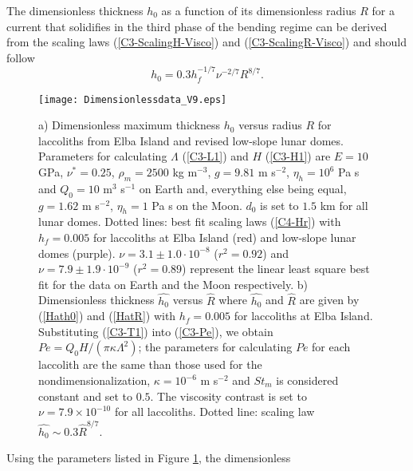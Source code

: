 The dimensionless thickness  $h_0$ as a function  of its dimensionless
radius $R$  for a current  that solidifies in  the third phase  of the
bending   regime    can   be    derived   from   the    scaling   laws
(\ref{C3-ScalingH-Visco})  and  (\ref{C3-ScalingR-Visco})  and  should
follow
\begin{equation}
  h_0 = 0.3 h_f^{-1/7}\nu^{-2/7}R^{8/7}\label{C4-Hr}.
\end{equation}
\begin{figure}[h!]
  \begin{center}
    \graphicspath{ {/Users/thorey/Documents/These/Projet/Refroidissement/Skin_Model/Figure/Figure_Heating/} }
    \texttt{[image: Dimensionlessdata\_V9.eps]}
    \caption{a)  Dimensionless maximum  thickness $h_0$  versus radius
      $R$ for laccoliths from Elba  Island and revised low-slope lunar
      domes.  Parameters  for calculating $\Lambda$  (\ref{C3-L1}) and
      $H$ (\ref{C3-H1}) are $E=10$  GPa, $\nu^*=0.25$, $\rho_m = 2500$
      kg  m$^{-3}$,  $g=9.81$ m  s$^{-2}$,  $\eta_h  =10^6$ Pa  s  and
      $Q_0 =  10$ m$^3$ s$^{-1}$  on Earth and, everything  else being
      equal, $g=1.62$ m s$^{-2}$, $\eta_h =1$  Pa s on the Moon. $d_0$
      is set to $1.5$ km for  all lunar domes.  Dotted lines: best fit
      scaling laws (\ref{C4-Hr}) with $h_f  = 0.005$ for laccoliths at
      Elba   Island  (red)   and  low-slope   lunar  domes   (purple).
      $\nu   =   3.1\pm   1.0    \cdot   10^{-8}$   ($r^2=0.92$)   and
      $\nu  = 7.9\pm  1.9  \cdot 10^{-9}$  ($r^2=0.89$) represent  the
      linear least square best fit for  the data on Earth and the Moon
      respectively.   b)  Dimensionless thickness  $\hat{h_0}$  versus
      $\hat{R}$  where   $\hat{h_0}$  and   $\hat{R}$  are   given  by
      (\ref{Hath0}) and  (\ref{HatR}) with $h_f=0.005$  for laccoliths
      at Elba Island.   Substituting (\ref{C3-T1}) into (\ref{C3-Pe}),
      we obtain $Pe  = Q_0 H /(\pi \kappa  \Lambda^2)$; the parameters
      for calculating $Pe$ for each  laccolith are the same than those
      used for the  nondimensionalization, $\kappa=10^{-6}$ m s$^{-2}$
      and  $St_m$  is  considered  constant and  set  to  $0.5$.   The
      viscosity contrast is  set to $\nu =7.9\times  10^{-10}$ for all
      laccoliths.         Dotted        line:       scaling        law
      $ \hat{h_0} \sim 0.3\hat{R}^{8/7}$.}
    \label{C4-Data}
  \end{center}
\end{figure}
Using the parameters listed in Figure \ref{C4-Data}, the dimensionless
